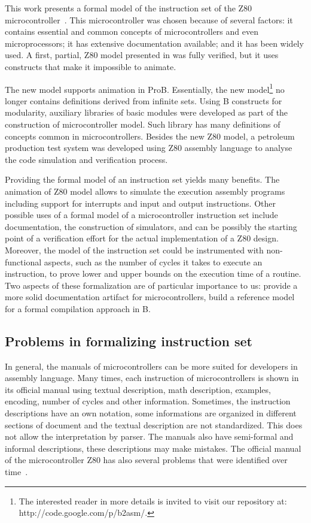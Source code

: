 \documentclass[a4paper]{llncs}
\begin{document}
This work presents a formal model of the instruction set of the Z80
microcontroller~\cite{Z80_manual}. This microcontroller was chosen
because of several factors: it contains essential and common concepts
of microcontrollers and even microprocessors; it has extensive
documentation available; and it has been widely used.  A first,
partial, Z80 model presented in \cite{Valerio_SBMF09} was fully
verified, but it uses constructs that make it impossible to animate.

The new model supports animation in ProB\cite{proB}.  Essentially, the
new model\footnote{The interested reader in more details is invited to
  visit our repository at: http://code.google.com/p/b2asm/.}  no
longer contains definitions derived from infinite sets. Using B
constructs for modularity, auxiliary libraries of basic modules were
developed as part of the construction of microcontroller model. Such
library has many definitions of concepts common in microcontrollers.
Besides the new Z80 model, a petroleum production test system was
developed using Z80 assembly language to analyse the code simulation
and verification process.

Providing the formal model of an instruction set yields many
benefits. The animation of Z80 model allows to simulate the execution
assembly programs including support for interrupts and input and
output instructions. Other possible uses of a formal model of a
microcontroller instruction set include documentation, the
construction of simulators, and can be possibly the starting point of
a verification effort for the actual implementation of a Z80
design. Moreover, the model of the instruction set could be
instrumented with non-functional aspects, such as the number of cycles
it takes to execute an instruction, to prove lower and upper bounds on
the execution time of a routine.  Two aspects of these formalization
are of particular importance to us: provide a more solid documentation
artifact for microcontrollers, build a reference model for a formal
compilation approach in B.


\subsection{Problems in formalizing instruction set}

In general, the manuals of microcontrollers can be more suited for 
developers in assembly language. Many times, each instruction of
microcontrollers is shown in its official manual using textual
description, math description, examples, encoding, number of cycles
and other information. Sometimes, the instruction descriptions have
an own notation, some informations are organized in different sections
of document and the textual description are not standardized. This
does not allow the interpretation by parser.  The manuals also have
semi-formal and informal descriptions, these descriptions may make
mistakes.  The official manual of the microcontroller Z80 has also
several problems that were identified over
time~\cite{UndocumentedZ80}.
\end{document}
